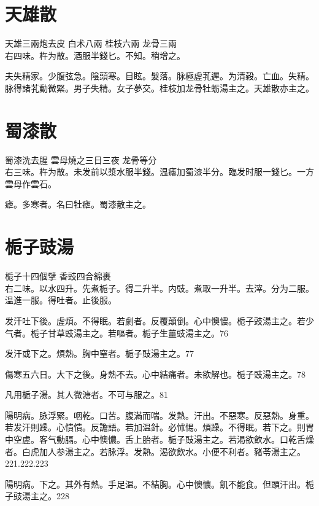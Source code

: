 \section{天雄散}

天雄{\scriptsize 三兩炮去皮} 白术{\scriptsize 八兩} 桂枝{\scriptsize 六兩} 龙骨{\scriptsize 三兩}\\
右四味。杵为散。酒服半錢匕。不知。稍增之。

夫失精家。少腹弦急。陰頭寒。目眩。髮落。脉極虗芤遲。为清穀。亡血。失精。脉得諸芤動微緊。男子失精。女子夢交。桂枝加龙骨牡蛎湯主之。天雄散亦主之。

\section{蜀漆散}

蜀漆{\scriptsize 洗去腥} 雲母{\scriptsize 燒之三日三夜} 龙骨{\scriptsize 等分}\\
右三味。杵为散。未发前以漿水服半錢。温瘧加蜀漆半分。臨发时服一錢匕。{\scriptsize 一方雲母作雲石。}

瘧。多寒者。名曰牡瘧。蜀漆散主之。

\section{栀子豉湯}

栀子{\scriptsize 十四個擘} 香豉{\scriptsize 四合綿裹}\\
右二味。以水四升。先煮栀子。得二升半。内豉。煮取一升半。去滓。分为二服。温進一服。得吐者。止後服。

发汗吐下後。虗煩。不得眠。若劇者。反覆顛倒。心中懊憹。栀子{\khaaitp 豉}湯主之。若少气者。栀子甘草{\khaaitp 豉}湯主之。若嘔者。栀子生薑{\khaaitp 豉}湯主之。76

发汗或下之。煩熱。胸中窒者。栀子{\khaaitp 豉}湯主之。77

傷寒五六日。大下之後。身熱不去。心中結痛者。未欲解也。栀子{\khaaitp 豉}湯主之。78

凡用栀子湯。其人微溏者。不可与服之。81

陽明病。脉浮緊。咽乾。口苦。腹滿而喘。发熱。汗出。不惡寒。反惡熱。身重。若发汗則躁。心憒憒。反譫語。若加温針。必怵惕。煩躁。不得眠。若下之。則胃中空虗。客气動膈。心中懊憹。舌上胎者。栀子{\khaaitp 豉}湯主之。若渴欲飲水。口乾舌燥者。白虎{\khaaitp 加人参}湯主之。若脉浮。发熱。渴欲飲水。小便不利者。豬苓湯主之。221.222.223

陽明病。下之。其外有熱。手足温。不結胸。心中懊憹。飢不能食。但頭汗出。栀子{\khaaitp 豉}湯主之。228

